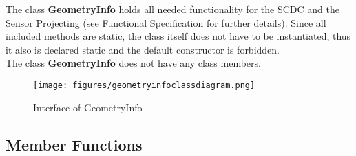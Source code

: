 The class \textbf{GeometryInfo} holds all needed functionality for the SCDC and the Sensor Projecting (see Functional Specification for further details). Since all included methods are static, the class itself does not have to be instantiated, thus it also is declared static and the default constructor is forbidden.\\
The class \textbf{GeometryInfo} does not have any class members.

\begin{figure}[h]
	\begin{center}
		\texttt{[image: figures/geometryinfoclassdiagram.png]}
		\caption{Interface of GeometryInfo}
	\end{center}
\end{figure}

\subsection{Member Functions}

